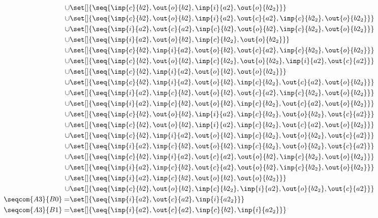 \begin{align*}
\cup&\set[]{\seq{\inp{c}{b2},\out{o}{b2},\inp{i}{a2},\out{o}{b2_2}}}\\
\cup&\set[]{\seq{\inp{c}{b2},\out{o}{b2},\inp{i}{a2},\out{c}{a2},\inp{c}{b2_2},\out{o}{b2_2}}}\\
\cup&\set[]{\seq{\inp{i}{a2},\out{c}{a2},\inp{c}{b2},\out{o}{b2},\inp{c}{b2_2},\out{o}{b2_2}}}\\
\cup&\set[]{\seq{\inp{i}{a2},\out{o}{b2},\inp{c}{b2_2},\out{o}{b2_2}}}\\
\cup&\set[]{\seq{\inp{c}{b2},\inp{i}{a2},\out{o}{b2},\out{c}{a2},\inp{c}{b2_2},\out{o}{b2_2}}}\\
\cup&\set[]{\seq{\inp{c}{b2},\out{o}{b2},\inp{c}{b2_2},\out{o}{b2_2},\inp{i}{a2},\out{c}{a2}}}\\
\cup&\set[]{\seq{\inp{c}{b2},\inp{i}{a2},\out{o}{b2},\out{o}{b2_2}}}\\
\cup&\set[]{\seq{\inp{c}{b2},\inp{i}{a2},\out{o}{b2},\inp{c}{b2_2},\out{c}{a2},\out{o}{b2_2}}}\\
\cup&\set[]{\seq{\inp{i}{a2},\inp{c}{b2},\out{o}{b2},\out{c}{a2},\inp{c}{b2_2},\out{o}{b2_2}}}\\
\cup&\set[]{\seq{\inp{i}{a2},\inp{c}{b2},\out{o}{b2},\inp{c}{b2_2},\out{c}{a2},\out{o}{b2_2}}}\\
\cup&\set[]{\seq{\inp{c}{b2},\out{o}{b2},\inp{i}{a2},\inp{c}{b2_2},\out{o}{b2_2},\out{c}{a2}}}\\
\cup&\set[]{\seq{\inp{c}{b2},\out{o}{b2},\inp{i}{a2},\inp{c}{b2_2},\out{c}{a2},\out{o}{b2_2}}}\\
\cup&\set[]{\seq{\inp{c}{b2},\inp{i}{a2},\out{o}{b2},\inp{c}{b2_2},\out{o}{b2_2},\out{c}{a2}}}\\
\cup&\set[]{\seq{\inp{i}{a2},\inp{c}{b2},\out{o}{b2},\inp{c}{b2_2},\out{o}{b2_2},\out{c}{a2}}}\\
\cup&\set[]{\seq{\inp{c}{b2},\inp{i}{a2},\out{c}{a2},\out{o}{b2},\inp{c}{b2_2},\out{o}{b2_2}}}\\
\cup&\set[]{\seq{\inp{i}{a2},\inp{c}{b2},\out{c}{a2},\out{o}{b2},\inp{c}{b2_2},\out{o}{b2_2}}}\\
\cup&\set[]{\seq{\inp{i}{a2},\inp{c}{b2},\out{o}{b2},\out{o}{b2_2}}}\\
\cup&\set[]{\seq{\inp{c}{b2},\out{o}{b2},\inp{c}{b2_2},\inp{i}{a2},\out{o}{b2_2},\out{c}{a2}}}\\
%
\seqcom{A3}{B0} = &\set[]{\seq{\inp{i}{a2},\out{c}{a2},\inp{i}{a2_2}}}\\
%
\seqcom{A3}{B1} = &\set[]{\seq{\inp{i}{a2},\out{c}{a2},\inp{c}{b2},\inp{i}{a2_2}}}\\

\end{align*}
